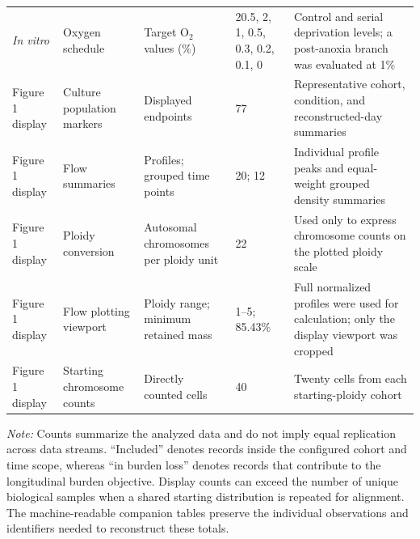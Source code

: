 \begin{table}[!htbp]
{\begin{tabular}{@{}p{}p{}p{}p{}p{}@{}}
\textit{In vitro} & Oxygen schedule & Target O$_2$ values (\%) & 20.5, 2, 1, 0.5, 0.3, 0.2, 0.1, 0 & Control and serial deprivation levels; a post-anoxia branch was evaluated at 1\% \\
Figure 1 display & Culture population markers & Displayed endpoints & 77 & Representative cohort, condition, and reconstructed-day summaries \\
Figure 1 display & Flow summaries & Profiles; grouped time points & 20; 12 & Individual profile peaks and equal-weight grouped density summaries \\
Figure 1 display & Ploidy conversion & Autosomal chromosomes per ploidy unit & 22 & Used only to express chromosome counts on the plotted ploidy scale \\
Figure 1 display & Flow plotting viewport & Ploidy range; minimum retained mass & 1--5; 85.43\% & Full normalized profiles were used for calculation; only the display viewport was cropped \\
Figure 1 display & Starting chromosome counts & Directly counted cells & 40 & Twenty cells from each starting-ploidy cohort \\
\bottomrule
\end{tabular}%
}
\par\vspace{0.5em}
\begin{minipage}{0.96\textwidth}
\footnotesize
\textit{Note:} Counts summarize the analyzed data and do not imply equal replication across data streams. ``Included'' denotes records inside the configured cohort and time scope, whereas ``in burden loss'' denotes records that contribute to the longitudinal burden objective. Display counts can exceed the number of unique biological samples when a shared starting distribution is repeated for alignment. The machine-readable companion tables preserve the individual observations and identifiers needed to reconstruct these totals.
\end{minipage}
\end{table}
